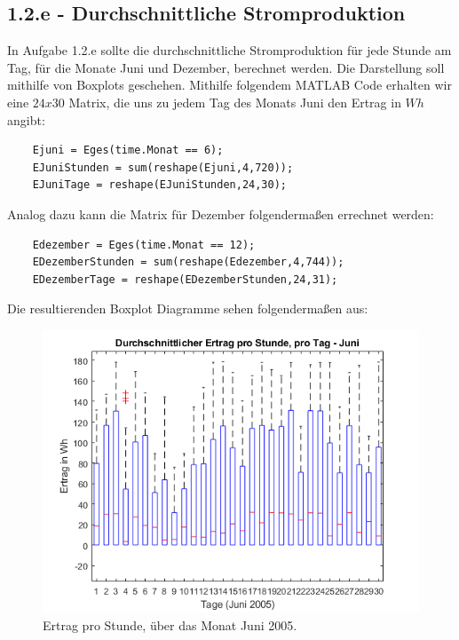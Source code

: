 \documentclass[a4paper,12pt]{article}
\begin{document}
	\subsection{1.2.e - Durchschnittliche Stromproduktion}
	In Aufgabe 1.2.e sollte die durchschnittliche Stromproduktion für jede Stunde am Tag, für die Monate Juni und Dezember, berechnet werden. Die Darstellung soll mithilfe von Boxplots geschehen.\newline
	Mithilfe folgendem MATLAB Code erhalten wir eine $24 x 30$ Matrix, die uns zu jedem Tag des Monats Juni den Ertrag in $Wh$ angibt:
	\begin{lstlisting}
	Ejuni = Eges(time.Monat == 6);
	EJuniStunden = sum(reshape(Ejuni,4,720));
	EJuniTage = reshape(EJuniStunden,24,30);
	\end{lstlisting}
	Analog dazu kann die Matrix für Dezember folgendermaßen errechnet werden:
	\begin{lstlisting}
	Edezember = Eges(time.Monat == 12);
	EDezemberStunden = sum(reshape(Edezember,4,744));
	EDezemberTage = reshape(EDezemberStunden,24,31);
	\end{lstlisting}
	Die resultierenden Boxplot Diagramme sehen folgendermaßen aus:
	\begin{figure}[H]
		\centering
		\includegraphics[width=12cm]{img/results/ErtragProStunde_Juni}
		\caption{Ertrag pro Stunde, über das Monat Juni 2005.}
	\end{figure}
\end{document}
